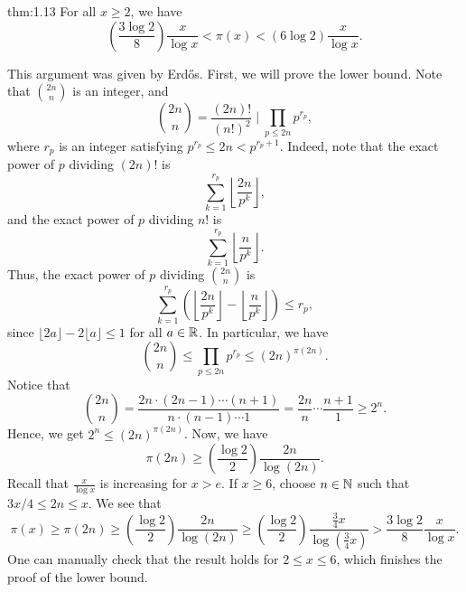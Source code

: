\begin{theo}{thm:1.13}
For all $x \geq 2$, we have 
\[ \left( \frac{3\log 2}8 \right) \frac{x}{\log x} < \pi(x) < (6\log 2) \frac{x}{\log x}. \]
\end{theo}
\begin{pf}
This argument was given by Erd\H{o}s. First, we will prove the lower bound. Note that $\binom{2n}n$ is 
an integer, and 
\[ \binom{2n}n = \frac{(2n)!}{(n!)^2} \; \bigg\rvert \; \prod_{p\leq 2n} p^{r_p}, \]
where $r_p$ is an integer satisfying $p^{r_p} \leq 2n < p^{r_p+1}$. Indeed, note that 
the exact power of $p$ dividing $(2n)!$ is 
\[ \sum_{k=1}^{r_p} \left\lfloor \frac{2n}{p^k} \right\rfloor, \]
and the exact power of $p$ dividing $n!$ is 
\[ \sum_{k=1}^{r_p} \left\lfloor \frac{n}{p^k} \right\rfloor. \]
Thus, the exact power of $p$ dividing $\binom{2n}n$ is 
\[ \sum_{k=1}^{r_p} \left( \left\lfloor \frac{2n}{p^k} \right\rfloor -  \left\lfloor \frac{n}{p^k} \right\rfloor \right) \leq r_p, \] 
since $\lfloor 2a \rfloor - 2\lfloor a \rfloor \leq 1$ for all $a \in \mathbb{R}$. In particular, we have 
\[ \binom{2n}n \leq \prod_{p \leq 2n} p^{r_p} \leq (2n)^{\pi(2n)}. \]
Notice that 
\[ \binom{2n}n = \frac{2n \cdot (2n-1) \cdots (n+1)}{n \cdot (n-1) \cdots 1} = \frac{2n}n \cdots 
\frac{n+1}1 \geq 2^n. \]
Hence, we get $2^n \leq (2n)^{\pi(2n)}$. Now, we have 
\[ \pi(2n) \geq \left( \frac{\log 2}2 \right) \frac{2n}{\log(2n)}. \]
Recall that $\frac{x}{\log x}$ is increasing for $x > e$. If $x \geq 6$, choose $n \in \mathbb{N}$ such that 
$3x/4 \leq 2n \leq x$. We see that 
\[ \pi(x) \geq \pi(2n) \geq \left( \frac{\log 2}2 \right) \frac{2n}{\log(2n)} 
\geq \left( \frac{\log 2}2 \right) \frac{\frac34x}{\log(\frac34x)} > \frac{3\log 2}8 \frac{x}{\log x}. \]
One can manually check that the result holds for $2 \leq x \leq 6$, which finishes the proof of the lower 
bound. 


\end{pf}
